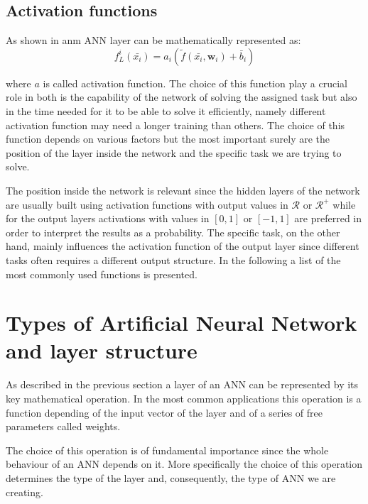 \subsection{Activation functions}\label{activations}

As shown in  anm ANN layer can be mathematically represented as:
\begin{equation}
    f_L^i (\bar{x_i})=a_i \left( \tilde{f}(\bar{x_i}, \boldsymbol{w}_i) + \bar{b}_i \right) 
    \label{eq:layer_math}
\end{equation}

where $a$ is called activation function. The choice of this function play a crucial role in both is the capability of the network of solving the assigned task but also in the time needed for it to be able to solve it efficiently, namely different activation function may need a longer training than others. The choice of this function depends on various factors but the most important surely are the position of the layer inside the network and the specific task we are trying to solve.

The position inside the network is relevant since the hidden layers of the network are usually built using activation functions with output values in $\mathcal{R}$ or $\mathcal{R}^+$ while for the output layers activations with values in $[0,1]$ or $[-1,1]$ are preferred in order to interpret the results as a probability.
The specific task, on the other hand, mainly influences the activation function of the output layer since different tasks often requires a different output structure.
In the following a list of the most commonly used functions is presented.



 

\section{Types of Artificial Neural Network and layer structure}
\label{ANN_type}

As described in the previous section a layer of an ANN can be represented by its key mathematical operation. In the most common applications this operation is a function depending of the input vector of the layer and of a series of free parameters called weights.

The choice of this operation is of fundamental importance since the whole behaviour of an ANN depends on it. More specifically the choice of this operation determines the type of the layer and, consequently, the type of ANN we are creating. 

